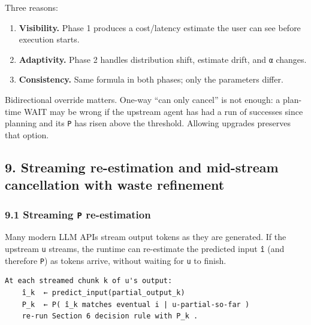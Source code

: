 \documentclass[
  11pt,
]{article}
\providecommand{\tightlist}{%
  \setlength{\itemsep}{0pt}\setlength{\parskip}{0pt}}
\begin{document}
Three reasons:

\begin{enumerate}
\def\labelenumi{\arabic{enumi}.}
\tightlist
\item
  \textbf{Visibility.} Phase 1 produces a cost/latency estimate the user
  can see before execution starts.
\item
  \textbf{Adaptivity.} Phase 2 handles distribution shift, estimate
  drift, and \texttt{α} changes.
\item
  \textbf{Consistency.} Same formula in both phases; only the parameters
  differ.
\end{enumerate}

Bidirectional override matters. One-way ``can only cancel'' is not
enough: a plan-time WAIT may be wrong if the upstream agent has had a
run of successes since planning and its \texttt{P} has risen above the
threshold. Allowing upgrades preserves that option.

\subsection{9. Streaming re-estimation and mid-stream cancellation with
waste
refinement}\label{streaming-re-estimation-and-mid-stream-cancellation-with-waste-refinement}

\subsubsection{\texorpdfstring{9.1 Streaming \texttt{P}
re-estimation}{9.1 Streaming P re-estimation}}\label{streaming-p-re-estimation}

Many modern LLM APIs stream output tokens as they are generated. If the
upstream \texttt{u} streams, the runtime can re-estimate the predicted
input \texttt{î} (and therefore \texttt{P}) as tokens arrive, without
waiting for \texttt{u} to finish.

\begin{verbatim}
At each streamed chunk k of u's output:
    î_k  ← predict_input(partial_output_k)
    P_k  ← P( î_k matches eventual i | u-partial-so-far )
    re-run Section 6 decision rule with P_k .
\end{verbatim}
\end{document}
